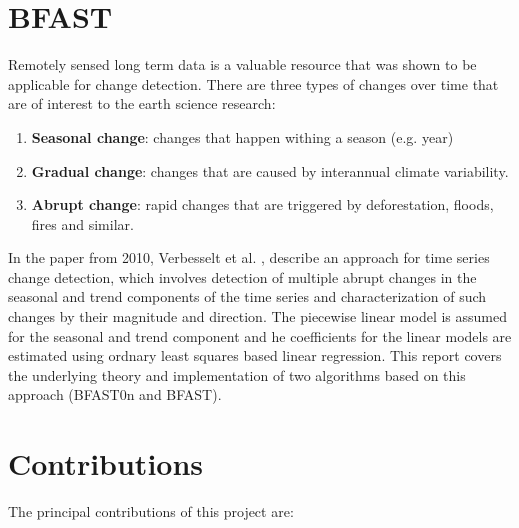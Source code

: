 \documentclass[main.tex]{subfiles}
\begin{document}
\section{BFAST}
\label{sec:changes}
Remotely sensed long term data is a valuable resource that was shown to be applicable for
change detection. There are three types of changes over time that are of
interest to the earth science research:
\begin{enumerate}
\item \textbf{Seasonal change}: changes that happen withing a season (e.g. year)
\item \textbf{Gradual change}: changes that are caused by interannual climate
  variability.
\item \textbf{Abrupt change}: rapid changes that are triggered by deforestation,
  floods, fires and similar.
\end{enumerate}
In the paper from 2010, Verbesselt et al. \cite{bfast}, describe an approach for
time series change detection, which involves
detection of multiple abrupt changes in the seasonal and trend components of the time series and
characterization of such changes by their magnitude and direction. The
piecewise linear model is assumed for the seasonal and trend component and he
coefficients for the linear models are estimated using ordnary least squares
based linear regression.
This report covers the underlying theory and implementation of two algorithms based
on this approach (BFAST0n and BFAST).

\section{Contributions}
\label{sec:contributions}
The principal contributions of this project are: 
\end{document}
